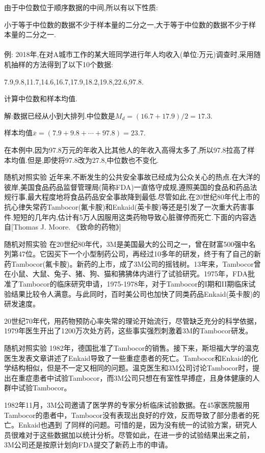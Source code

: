 	\begin{frame}
		由于中位数位于顺序数据的中间,所以有以下性质:
		
		\alert{小于等于中位数的数据不少于样本量的二分之一,大于等于中位数的数据不少于样本量的二分之一}.
		\\ \hspace*{\fill} \\
		例: 2018年,在对A城市工作的某大班同学进行年人均收入(单位:万元)调查时,采用随机抽样的方法得到了以下10个数据:
		
		7.9,9.8,11.7,14.6,16.7,17.9,18.2,19.8,22.6,97.8.
		
		计算中位数和样本均值.
		
		解:数据已经从小到大排列.中位数是$M_d = (16.7+17.9)/2 = 17.3.$
		
		样本均值$\overline{x} = (7.9+9.8+\cdots+97.8) = 23.7.$
		
		在本例中,因为97.8万元的年收入比其他人的年收入高得太多了,所以97.8拉高了样本均值.但是,即使将97.8改为27.8,中位数也不变化.
	\end{frame}

	\begin{frame}{随机对照实验}
		近年来,不断发生的公共安全事故已经成为公众关心的热点.在大洋的彼岸,美国食品药品监督管理局(简称FDA)一直恪守成规,遵照美国的食品和药品法规行事,最大程度地将食品药品安全事故降到最低.尽管如此,在20世纪80年代上市的抗心律失常药Tambocor(氟卡胺)和Enkaid(英卡胺)等还是引发了一次重大药害事件.短短的几年内,估计有5万人因服用这类药物导致心脏骤停而死亡.下面的内容选自[Thomas J. Moore. 《致命的药物》]
	\end{frame}

	\begin{frame}{随机对照实验}
		在20世纪80年代，3M是美国最大的公司之一，曾在财富500强中名列第47位。它因买下一个小型制药公司，再经过10多年的研发，终于有了自己的新药Tambocor(氟卡胺)。新药的上市，成了3M公司的摇钱树。13年来，Tambocor曾在小鼠、大鼠、兔子、猪、狗、猫和狒狒体内进行了试验研究。1975年，FDA批准了Tambocor的临床研究申请，1975-1978年，对于Tambocor的I期和II期临床试验结果比较令人满意。与此同时，百时美公司也加快了同类药品Enkaid(英卡胺)的研发速度。
		
		20世纪70年代，用药物预防心率失常的理论开始流行，尽管缺乏充分的科学依据，1979年医生开出了1200万次处方药，这些事实强烈刺激着3M的Tambocor研发。
		
	\end{frame}

	\begin{frame}{随机对照实验}
		1982年，德国批准了Tambocor的销售。接下来，斯坦福大学的温克医生发表文章讲述了Enkaid导致了一些重症患者的死亡。Tambocor和Enkaid的化学结构相似，但是不一定又相同的问题。温克医生和3M公司讨论Tambocor时，提出在重症患者中试验Tambocor，而3M公司只想在有室性早搏症，且身体健康的人群中试验Tambocor。
		
		1982年11月，3M公司邀请了医学界的专家分析临床试验数据。在45家医院服用Tambocor的患者中，Tambocor没有表现出良好的疗效，反而导致了部分患者的死亡。Enkaid也遇到 了同样的问题。\alert{可惜的是，因为没有统一的试验方案，研究人员很难对于这些数据加以统计分析。}尽管如此，在进一步的试验结果出来之前，3M公司还是按原计划向FDA提交了新药上市的申请。
	\end{frame}

